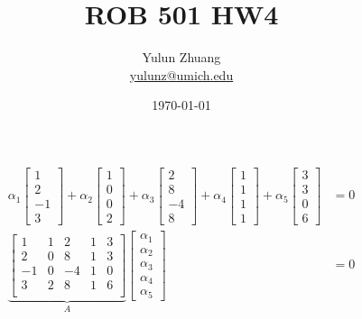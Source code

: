 \documentclass{article}
\title{ROB 501 HW4}
\author{Yulun Zhuang \\ \href{mailto:yulunz@umich.edu}{yulunz@umich.edu}}
\date{\today}
\theoremstyle{definition} %
\begin{document}
\maketitle

\section{}

\begin{align*}
    \alpha_1 
    \begin{bmatrix}
        1 \\ 2 \\ -1 \\ 3
    \end{bmatrix}
    +
    \alpha_2 
    \begin{bmatrix}
        1 \\ 0 \\ 0 \\ 2
    \end{bmatrix}
    +
    \alpha_3 
    \begin{bmatrix}
        2 \\ 8 \\ -4 \\ 8
    \end{bmatrix}
    +
    \alpha_4 
    \begin{bmatrix}
        1 \\ 1 \\ 1 \\ 1
    \end{bmatrix}
    +
    \alpha_5
    \begin{bmatrix}
        3 \\ 3 \\ 0 \\ 6
    \end{bmatrix}
    &= 0
    \\
    \underbrace{
    \begin{bmatrix}
        1 & 1 & 2 & 1 & 3 \\
        2 & 0 & 8 & 1 & 3 \\
        -1 & 0 & -4 & 1 & 0 \\
        3 & 2 & 8 & 1 & 6 \\
    \end{bmatrix}
    }_A
    \begin{bmatrix}
        \alpha_1 \\ \alpha_2 \\ \alpha_3 \\ \alpha_4 \\ \alpha_5
    \end{bmatrix}
    &= 0
\end{align*}
\end{document}
